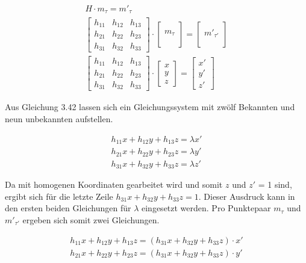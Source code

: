 \begin{gather}
H\cdot m_\tau = m'_{\tau}\\
\begin{bmatrix}
h_{11}&h_{12}&h_{13}\\
h_{21}&h_{22}&h_{23}\\
h_{31}&h_{32}&h_{33}
\end{bmatrix}
\cdot
\begin{bmatrix}
\\m_\tau\\\\
\end{bmatrix}
=
\begin{bmatrix}
\\m'_{\tau'}\\\\
\end{bmatrix}\\
\begin{bmatrix}
h_{11}&h_{12}&h_{13}\\
h_{21}&h_{22}&h_{23}\\
h_{31}&h_{32}&h_{33}
\end{bmatrix}
\cdot
\begin{bmatrix}
x\\y\\z
\end{bmatrix}
=
\begin{bmatrix}
x'\\y'\\z'
\end{bmatrix}
\end{gather}

Aus Gleichung 3.42 lassen sich ein Gleichungssystem mit zwölf Bekannten und neun unbekannten aufstellen.  

\begin{gather}
h_{11}x+h_{12}y+h_{13}z= \lambda x'\\
h_{21}x+h_{22}y+h_{23}z= \lambda y'\\
h_{31}x+h_{32}y+h_{33}z= \lambda z'
\end{gather}

Da mit homogenen Koordinaten gearbeitet wird und somit $z$ und $z'$ = 1 sind, ergibt sich für die letzte Zeile $h_{31}x+h_{32}y+h_{33}z= 1$. Dieser Ausdruck kann in den ersten beiden Gleichungen für $\lambda$ eingesetzt werden. Pro Punktepaar $m_\tau$ und $m'_{\tau'}$ ergeben sich somit zwei Gleichungen. 

\begin{gather}
	h_{11}x+h_{12}y+h_{13}z= (h_{31}x+h_{32}y+h_{33}z) \cdot x'\\
		h_{21}x+h_{22}y+h_{23}z= (h_{31}x+h_{32}y+h_{33}z) \cdot y'
\end{gather}

